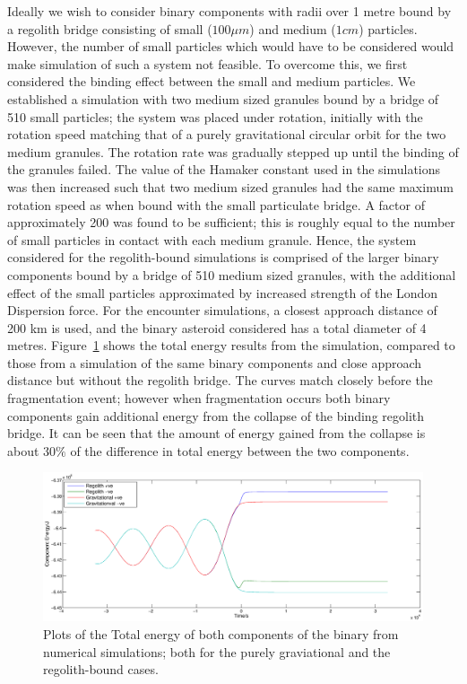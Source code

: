 \documentclass[letterpaper, preprint, paper,11pt]{AAS}	%
\begin{document}
Ideally we wish to consider binary components with radii over 1 metre bound by a regolith bridge consisting of small ($100\mu m$) and medium ($1cm$) particles. However, the number of small particles which would have to be considered would make simulation of such a system not feasible. To overcome this, we first considered the binding effect between the small and medium particles. We established a simulation with two medium sized granules bound by a bridge of 510 small particles; the system was placed under rotation, initially with the rotation speed matching that of a purely gravitational circular orbit for the two medium granules. The rotation rate was gradually stepped up until the binding of the granules failed. The value of the Hamaker constant used in the simulations was then increased such that two medium sized granules had the same maximum rotation speed as when bound with the small particulate bridge. A factor of approximately 200 was found to be sufficient; this is roughly equal to the number of small particles in contact with each medium granule. Hence, the system considered for the regolith-bound simulations is comprised of the larger binary components bound by a bridge of 510 medium sized granules, with the additional effect of the small particles approximated by increased strength of the London Dispersion force.    
For the encounter simulations, a closest approach distance of 200 km is used, and the binary asteroid considered has a total diameter of 4 metres. Figure~\ref{fig:reg} shows the total energy results from the simulation, compared to those from a simulation of the same binary components and close approach distance but without the regolith bridge. The curves match closely before the fragmentation event; however when fragmentation occurs both binary components gain additional energy from the collapse of the binding regolith bridge. It can be seen that the amount of energy gained from the collapse is about $30\%$ of the difference in total energy between the two components.   
\begin{figure}[H]
\centering
\includegraphics[width=\textwidth]{regolith_v_gravitational.eps} 
\caption{Plots of the Total energy of both components of the binary from numerical simulations; both for the purely graviational and the regolith-bound cases.} 
\label{fig:reg}
\end{figure}
\end{document}
